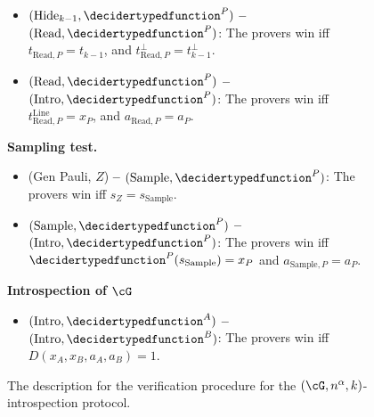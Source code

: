 \begin{figure}[b!]
\begin{gamespec}
\begin{itemize}
			The provers win iff
			\begin{equation*}
				\tilde{t}_{\leq i }^{\bot} = t_{\leq i }^{\bot},\quad  \bar{r}_{i}^{C} = \tilde{t}_{i +1 }^{\bot}, \quad \tilde{t}_{< i }^{\text{Line}} = t_{< i }^{\text{Line}}, \quad \bar{r}_{>i+1} = r_{>i+1}.
			\end{equation*} 
			\item $(\text{Hide}_{k-1}, \decidertypedfunction^{P})$ \textbf{--}   $(\text{Read},  \decidertypedfunction^{P})$: The provers win iff $t_{\text{Read}, P} = t_{k-1}$, and  $t_{\text{Read}, P}^{\bot} = t_{k-1}^{\bot}$.
			\item  $(\text{Read},  \decidertypedfunction^{P})$ \textbf{--}  $(\text{Intro},  \decidertypedfunction^{P})$: The provers win iff $t_{\text{Read}, P}^{\text{Line}} = x_P$, and $a_{\text{Read}, P} = a_P$.
		\end{itemize}
		\textbf{Sampling test. }
		\begin{itemize}
			\item (Gen Pauli, $Z$) \textbf{--} $(\text{Sample}, \decidertypedfunction^{P})$: The provers win iff $s_Z = s_{\text{Sample}}$. 
			\item $(\text{Sample}, \decidertypedfunction^{P})$ \textbf{--} $(\text{Intro},  \decidertypedfunction^{P})$: The provers win iff $\decidertypedfunction^{P}(s_{\text{Sample}}) = x_P$ and  $a_{\text{Sample}, P} = a_P$.
		\end{itemize}
		\textbf{Introspection of $\cG$ }
		\begin{itemize}
			\item $(\text{Intro},  \decidertypedfunction^{A})$   \color{purple} \textbf{--}   \color{black} $(\text{Intro},  \decidertypedfunction^{B})$: The provers win iff $D(x_A,x_B,a_A, a_B) = 1$. 
		\end{itemize}
		\vspace{1em}
	\end{gamespec}
	\caption{ The description for the verification procedure for the $(\cG,n^\alpha, k)$-introspection protocol. }
	\label{fig:Introspectionverification}
\end{figure}

